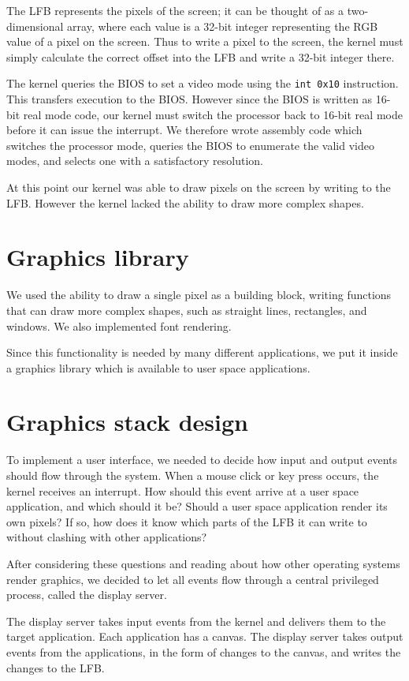 \documentclass{report}
\begin{document}
The LFB represents the pixels of the screen; it can be thought of as a
two-dimensional array, where each value is a 32-bit integer representing the
RGB value of a pixel on the screen. Thus to write a pixel to the screen, the
kernel must simply calculate the correct offset into the LFB and write a
32-bit integer there.

The kernel queries the BIOS to set a video mode using the
\texttt{int 0x10} instruction. This transfers execution to the BIOS. However
since the BIOS is written as 16-bit real mode code, our kernel must switch the
processor back to 16-bit real mode before it can issue the interrupt.
We therefore wrote assembly code which switches the processor mode,
queries the BIOS to enumerate the valid video modes, and selects one with a
satisfactory resolution.

At this point our kernel was able to draw pixels on the screen by writing to
the LFB. However the kernel lacked the ability to draw more complex shapes.


\section{Graphics library}
We used the ability to draw a single pixel as a building block, writing
functions that can draw more complex shapes, such as straight lines,
rectangles, and windows. We also implemented font rendering.

Since this functionality is needed by many different applications, we put it
inside a graphics library which is available to user space applications.


\section{Graphics stack design}
To implement a user interface, we needed to decide how input and output events
should flow through the system. When a mouse click or key press occurs, the
kernel receives an interrupt. How should this event arrive at a user space
application, and which should it be? Should a user space application render
its own pixels? If so, how does it know which parts of the LFB it can write to
without clashing with other applications? 

After considering these questions and reading about how other operating
systems render graphics, we decided to let all events flow through a central
privileged process, called the display server. 

The display server takes input events from the kernel and delivers them to the
target application. Each application has a canvas. The display server takes
output events from the applications, in the form of changes to the canvas, and
writes the changes to the LFB.
\end{document}
